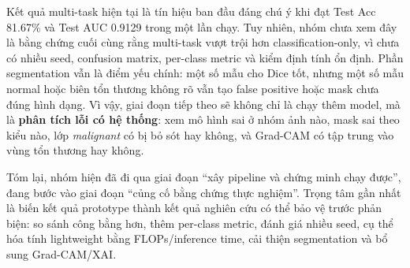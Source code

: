 \documentclass[12pt,a4paper]{article}
\begin{document}
Kết quả multi-task hiện tại là tín hiệu ban đầu đáng chú ý khi đạt Test Acc 81.67\% và Test AUC 0.9129 trong một lần chạy. Tuy nhiên, nhóm chưa xem đây là bằng chứng cuối cùng rằng multi-task vượt trội hơn classification-only, vì chưa có nhiều seed, confusion matrix, per-class metric và kiểm định tính ổn định. Phần segmentation vẫn là điểm yếu chính: một số mẫu cho Dice tốt, nhưng một số mẫu normal hoặc biên tổn thương không rõ vẫn tạo false positive hoặc mask chưa đúng hình dạng. Vì vậy, giai đoạn tiếp theo sẽ không chỉ là chạy thêm model, mà là \textbf{phân tích lỗi có hệ thống}: xem mô hình sai ở nhóm ảnh nào, mask sai theo kiểu nào, lớp \textit{malignant} có bị bỏ sót hay không, và Grad-CAM có tập trung vào vùng tổn thương hay không.

Tóm lại, nhóm hiện đã đi qua giai đoạn ``xây pipeline và chứng minh chạy được'', đang bước vào giai đoạn ``củng cố bằng chứng thực nghiệm''. Trọng tâm gần nhất là biến kết quả prototype thành kết quả nghiên cứu có thể bảo vệ trước phản biện: so sánh công bằng hơn, thêm per-class metric, đánh giá nhiều seed, cụ thể hóa tính lightweight bằng FLOPs/inference time, cải thiện segmentation và bổ sung Grad-CAM/XAI.
\end{document}
